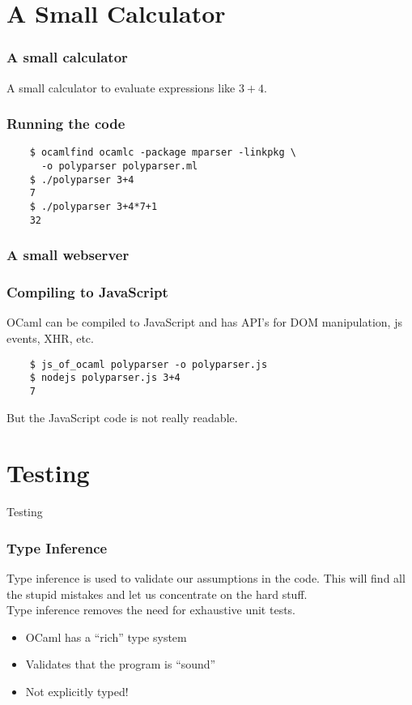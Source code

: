 \documentclass[xcolor=svgnames]{beamer}
\renewcommand{\_}{\mathunderscore}
\begin{document}
\section{A Small Calculator}
\begin{frame}[fragile]
  \frametitle{A small calculator}
  A small calculator to evaluate expressions like $3 + 4$.
  \pause
  
\end{frame}

\begin{frame}[fragile]
  \frametitle{Running the code}
  \begin{lstlisting}
    $ ocamlfind ocamlc -package mparser -linkpkg \
      -o polyparser polyparser.ml
    $ ./polyparser 3+4
    7
    $ ./polyparser 3+4*7+1
    32
  \end{lstlisting}
\end{frame}

\begin{frame}[fragile]
  \frametitle{A small webserver}
  
\end{frame}

\begin{frame}[fragile]
  \frametitle{Compiling to JavaScript}
  OCaml can be compiled to JavaScript and has API's for DOM
  manipulation, js events, XHR, etc.

  \begin{lstlisting}
    $ js_of_ocaml polyparser -o polyparser.js
    $ nodejs polyparser.js 3+4
    7
  \end{lstlisting}
  \pause
  But the JavaScript code is not really readable.
\end{frame}

\section{Testing}
\begin{frame}[fragile]
  \begin{center}
    \Huge Testing
  \end{center}
\end{frame}

\begin{frame}[fragile]
  \frametitle{Type Inference}
  Type inference is used to validate our assumptions in the code. This
  will find all the stupid mistakes and let us concentrate on the hard
  stuff.\newline\\
  \pause
  Type inference removes the need for exhaustive unit tests.\newline
  \pause
  \begin{itemize}
    \item OCaml has a ``rich'' type system
    \item Validates that the program is ``sound''
    \item Not explicitly typed!
  \end{itemize}
\end{frame}
\end{document}
